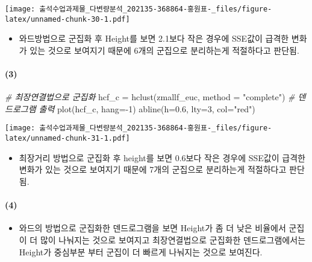 \documentclass[
]{article}
\newenvironment{Shaded}{\begin{snugshade}}{\end{snugshade}}
\newcommand{\AttributeTok}[1]{\textcolor[rgb]{0.77,0.63,0.00}{#1}}
\newcommand{\CommentTok}[1]{\textcolor[rgb]{0.56,0.35,0.01}{\textit{#1}}}
\newcommand{\DecValTok}[1]{\textcolor[rgb]{0.00,0.00,0.81}{#1}}
\newcommand{\FloatTok}[1]{\textcolor[rgb]{0.00,0.00,0.81}{#1}}
\newcommand{\FunctionTok}[1]{\textcolor[rgb]{0.00,0.00,0.00}{#1}}
\newcommand{\NormalTok}[1]{#1}
\newcommand{\OtherTok}[1]{\textcolor[rgb]{0.56,0.35,0.01}{#1}}
\newcommand{\SpecialCharTok}[1]{\textcolor[rgb]{0.00,0.00,0.00}{#1}}
\newcommand{\StringTok}[1]{\textcolor[rgb]{0.31,0.60,0.02}{#1}}
\providecommand{\tightlist}{%
  \setlength{\itemsep}{0pt}\setlength{\parskip}{0pt}}
\begin{document}
\texttt{[image: 출석수업과제물\_다변량분석\_202135-368864-홍원표-\_files/figure-latex/unnamed-chunk-30-1.pdf]}

\begin{itemize}
\tightlist
\item
  와드방법으로 군집화 후 Height를 보면 2.1보다 작은 경우에 SSE값이
  급격한 변화가 있는 것으로 보여지기 때문에 6개의 군집으로 분리하는게
  적절하다고 판단됨.
\end{itemize}

\hypertarget{section-12}{%
\paragraph{(3)}\label{section-12}}

\begin{Shaded}
\begin{Highlighting}[]
\CommentTok{\# 최장연결법으로 군집화}
\NormalTok{hcf\_c }\OtherTok{=} \FunctionTok{hclust}\NormalTok{(zmallf\_euc, }\AttributeTok{method =} \StringTok{"complete"}\NormalTok{)}
\CommentTok{\# 덴드로그램 출력}
\FunctionTok{plot}\NormalTok{(hcf\_c, }\AttributeTok{hang=}\SpecialCharTok{{-}}\DecValTok{1}\NormalTok{)}
\FunctionTok{abline}\NormalTok{(}\AttributeTok{h=}\FloatTok{0.6}\NormalTok{, }\AttributeTok{lty=}\DecValTok{3}\NormalTok{, }\AttributeTok{col=}\StringTok{"red"}\NormalTok{)}
\end{Highlighting}
\end{Shaded}

\texttt{[image: 출석수업과제물\_다변량분석\_202135-368864-홍원표-\_files/figure-latex/unnamed-chunk-31-1.pdf]}

\begin{itemize}
\tightlist
\item
  최장거리 방법으로 군집화 후 height를 보면 0.6보다 작은 경우에 SSE값이
  급격한 변화가 있는 것으로 보여지기 때문에 7개의 군집으로 분리하는게
  적절하다고 판단됨.
\end{itemize}

\hypertarget{section-13}{%
\paragraph{(4)}\label{section-13}}

\begin{itemize}
\tightlist
\item
  와드의 방법으로 군집화한 덴드로그램을 보면 Height가 좀 더 낮은
  비율에서 군집이 더 많이 나눠지는 것으로 보여지고 최장연결법으로
  군집화한 덴드로그램에서는 Height가 중심부분 부터 군집이 더 빠르게
  나눠지는 것으로 보여진다.
\end{itemize}
\end{document}

